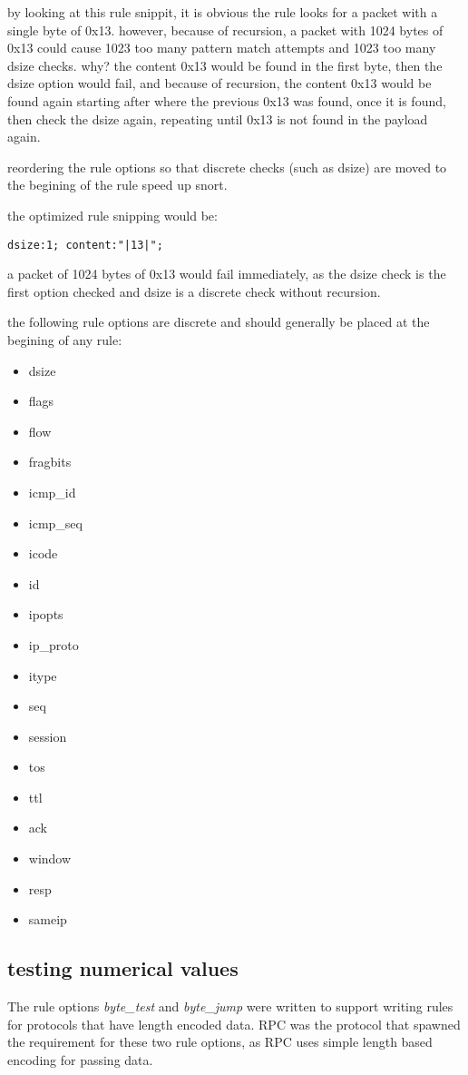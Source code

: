 \documentclass[english]{report}
\begin{document}
by looking at this rule snippit, it is obvious the rule looks for a packet with
a single byte of 0x13.  however, because of recursion, a packet with 1024 bytes
of 0x13 could cause 1023 too many pattern match attempts and 1023 too many
dsize checks.  why?  the content 0x13 would be found in the first byte, then
the dsize option would fail, and because of recursion, the content 0x13 would
be found again starting after where the previous 0x13 was found, once it is
found, then check the dsize again, repeating until 0x13 is not found in the
payload again.

reordering the rule options so that discrete checks (such as dsize) are moved to the begining of the rule speed up snort.  

the optimized rule snipping would be:
\begin{verbatim}
dsize:1; content:"|13|";
\end{verbatim}

a packet of 1024 bytes of 0x13 would fail immediately, as the dsize check is
the first option checked and dsize is a discrete check without recursion.

the following rule options are discrete and should generally be placed at the
begining of any rule:

\begin{itemize}
\item dsize
\item flags
\item flow
\item fragbits 
\item icmp\_id
\item icmp\_seq 
\item icode 
\item id 
\item ipopts 
\item ip\_proto 
\item itype 
\item seq 
\item session 
\item tos 
\item ttl 
\item ack 
\item window
\item resp 
\item sameip
\end{itemize}

\subsection{testing numerical values \label{testing numerical values}}
The rule options \emph{byte\_test} and \emph{byte\_jump} were written to
support writing rules for protocols that have length encoded data.  RPC was the protocol that spawned the requirement for these two rule options, as RPC uses simple length based encoding for passing data.
\end{document}

